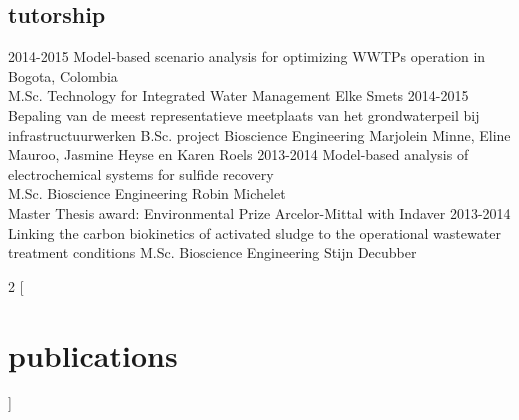 \documentclass[]{stvhoey-cv}  %
\begin{document}
\subsection*{tutorship}
\begin{entrylist}
  \entry
    {2014-2015}
    {Model-based scenario analysis for optimizing WWTPs operation in Bogota, Colombia\\}
    {M.Sc. Technology for Integrated Water Management}
    {Elke Smets }
  \entry
    {2014-2015}
    {Bepaling van de meest representatieve meetplaats van het grondwaterpeil bij infrastructuurwerken}
    {B.Sc. project Bioscience Engineering}
    {Marjolein Minne, Eline Mauroo, Jasmine Heyse en Karen Roels}
   \entry
    {2013-2014}
    {Model-based analysis of electrochemical systems for sulfide recovery\\}
    {M.Sc. Bioscience Engineering}
    {Robin Michelet\\ \small{Master Thesis award: Environmental Prize Arcelor-Mittal with Indaver}}
   \entry
    {2013-2014}
    {Linking the carbon biokinetics of activated sludge to the operational wastewater treatment conditions}
    {M.Sc. Bioscience Engineering}
    {Stijn Decubber}
\end{entrylist}

\begin{multicols}{2}
[
\section{publications}
]

\phantom{publications} %
\vspace{-26pt}


\begin{refsection}
  \nocite{*}
  \printbibliography[sorting=chronological, type=inproceedings, title={peer-reviewed conferences/proceedings}, notkeyword={oral}, notkeyword={poster}, heading=subbibliography]
\end{refsection}

\begin{refsection}
  \nocite{*}
  \printbibliography[sorting=chronological, type=inproceedings, title={conference presentations}, keyword={oral}, heading=subbibliography]
\end{refsection}

\begin{refsection}
  \nocite{*}
  \printbibliography[sorting=chronological, type=inproceedings, title={conference posters}, keyword={poster}, heading=subbibliography]
\end{refsection}


\end{multicols}
\end{document}
